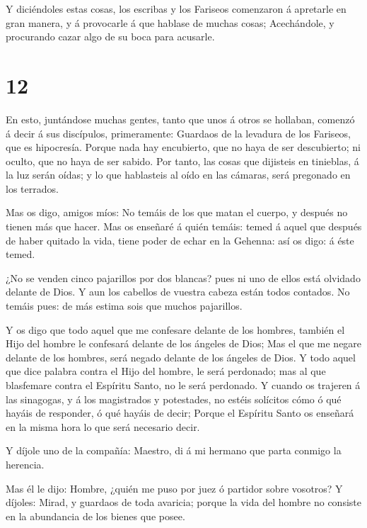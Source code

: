  Y diciéndoles estas cosas, los escribas y los Fariseos
comenzaron á apretarle en gran manera, y á provocarle á que hablase de
muchas cosas;  Acechándole, y procurando cazar algo de su
boca para acusarle.

\hypertarget{section-11}{%
\section{12}\label{section-11}}

 En esto, juntándose muchas gentes, tanto que unos á otros
se hollaban, comenzó á decir á sus discípulos, primeramente: Guardaos de
la levadura de los Fariseos, que es hipocresía.  Porque nada
hay encubierto, que no haya de ser descubierto; ni oculto, que no haya
de ser sabido.  Por tanto, las cosas que dijisteis en
tinieblas, á la luz serán oídas; y lo que hablasteis al oído en las
cámaras, será pregonado en los terrados.

 Mas os digo, amigos míos: No temáis de los que matan el
cuerpo, y después no tienen más que hacer.  Mas os enseñaré
á quién temáis: temed á aquel que después de haber quitado la vida,
tiene poder de echar en la Gehenna: así os digo: á éste temed.

 ¿No se venden cinco pajarillos por dos blancas? pues ni uno
de ellos está olvidado delante de Dios.  Y aun los cabellos
de vuestra cabeza están todos contados. No temáis pues: de más estima
sois que muchos pajarillos.

 Y os digo que todo aquel que me confesare delante de los
hombres, también el Hijo del hombre le confesará delante de los ángeles
de Dios;  Mas el que me negare delante de los hombres, será
negado delante de los ángeles de Dios.  Y todo aquel que
dice palabra contra el Hijo del hombre, le será perdonado; mas al que
blasfemare contra el Espíritu Santo, no le será perdonado. 
Y cuando os trajeren á las sinagogas, y á los magistrados y potestades,
no estéis solícitos cómo ó qué hayáis de responder, ó qué hayáis de
decir;  Porque el Espíritu Santo os enseñará en la misma
hora lo que será necesario decir.

 Y díjole uno de la compañía: Maestro, di á mi hermano que
parta conmigo la herencia.

 Mas él le dijo: Hombre, ¿quién me puso por juez ó partidor
sobre vosotros?  Y díjoles: Mirad, y guardaos de toda
avaricia; porque la vida del hombre no consiste en la abundancia de los
bienes que posee.

